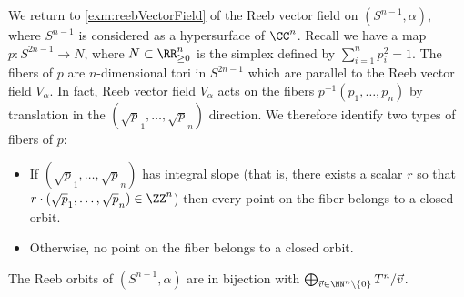 

    We return to \cref{exm:reebVectorField} of the Reeb vector field on $(S^{n-1},\alpha)$, where $S^{n-1}$ is considered as a hypersurface of $\CC^n$. Recall we have a map $p:S^{2n-1}\to N$, where $N\subset \RR_{\geq 0}^n$ is the simplex defined by $\sum_{i=1}^n p_i^2=1$. The fibers of $p$ are $n$-dimensional tori in $S^{2n-1}$ which are parallel to the Reeb vector field $V_\alpha$. In fact, Reeb vector field $V_\alpha$ acts on the fibers $p^{-1}(p_1, \ldots, p_n)$ by translation in the $(\sqrt p_1, \ldots, \sqrt p_n)$ direction. We therefore identify two types of fibers of $p$:
    \begin{itemize}
        \item If $(\sqrt p_1, \ldots, \sqrt p_n)$ has integral slope (that is, there exists a scalar $r$ so that $r\cdot(\sqrt p_1, \ldots, \sqrt p_n) \in \ZZ^n$) then every point on the fiber belongs to a closed orbit.
        \item Otherwise, no point on the fiber belongs to a closed orbit. 
    \end{itemize}
    The Reeb orbits of $(S^{n-1}, \alpha)$ are in bijection with $\bigoplus_{\vec v\in \NN^n\setminus \{0\}} T^n/\vec v$.
